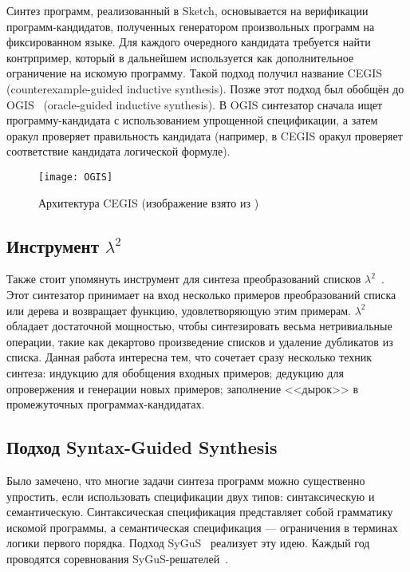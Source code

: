 \documentclass[14pt]{matmex-diploma-custom}
\begin{document}
Синтез программ, реализованный в Sketch, основывается на верификации программ-кандидатов, полученных генератором произвольных программ на фиксированном языке. Для каждого очередного кандидата требуется найти контрпример, который в дальнейшем используется как дополнительное ограничение на искомую программу. Такой подход получил название CEGIS (counterexample-guided inductive synthesis). Позже этот подход был обобщён до OGIS~\cite{Jha} (oracle-guided inductive synthesis). В OGIS синтезатор сначала ищет программу-кандидата с использованием упрощенной спецификации, а затем оракул проверяет правильность кандидата (например, в CEGIS оракул проверяет соответствие кандидата логической формуле).

\begin{figure}[H]
\caption{Архитектура CEGIS (изображение взято из \cite{Solar-Lezama})}
\centering
\texttt{[image: OGIS]}
\end{figure}



\subsection{Инструмент ${\lambda}^2$}
Также стоит упомянуть инструмент для синтеза преобразований списков ${\lambda}^2$~\cite{Lambda2}. Этот синтезатор принимает на вход несколько примеров преобразований списка или дерева и возвращает функцию, удовлетворяющую этим примерам. ${\lambda}^2$ обладает достаточной мощностью, чтобы синтезировать весьма нетривиальные операции, такие как декартово произведение списков и удаление дубликатов из списка. Данная работа интересна тем, что сочетает сразу несколько техник синтеза: индукцию для обобщения входных примеров; дедукцию для опровержения и генерации новых примеров; заполнение <<дырок>> в промежуточных программах-кандидатах.

\subsection{Подход Syntax-Guided Synthesis}
Было замечено, что многие задачи синтеза программ можно существенно упростить, если использовать спецификации двух типов: синтаксическую и семантическую. Синтаксическая спецификация представляет собой грамматику искомой программы, а семантическая спецификация --- ограничения в терминах логики первого порядка. Подход SyGuS~\cite{SyGuS} реализует эту идею. Каждый год проводятся соревнования SyGuS-решателей~\cite{SyGuScomp15, SyGuScomp16, SyGuScomp17}.
\end{document}
